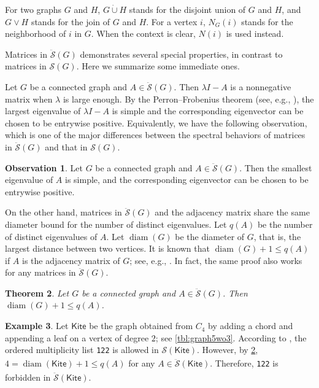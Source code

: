 \documentclass{article}
\newtheorem{theorem}{Theorem}[section]
\theoremstyle{definition}
\newtheorem{observation}[theorem]{Observation}
\newtheorem{example}[theorem]{Example}
\newcommand{\dunion}{\mathbin{\dot\cup}}
\newcommand{\mptn}{\mathcal{S}}
\newcommand{\mdso}{\ddot{\mathcal{S}}}
\newcommand{\Kite}{\mathsf{Kite}}
\newcommand{\mtt}[2][]{\texttt{#2}\textsubscript{#1}}
\newcommand{\diam}{\operatorname{diam}}
\begin{document}
For two graphs $G$ and $H$, $G\dunion H$ stands for the disjoint union of $G$ and $H$, and $G\vee H$ stands for the join of $G$ and $H$.  For a vertex $i$, $N_G(i)$ stands for the neighborhood of $i$ in $G$.   When the context is clear, $N(i)$ is used instead.

Matrices in $\mdso(G)$ demonstrates several special properties, in contrast to matrices in $\mptn(G)$.  Here we summarize some immediate ones.

Let $G$ be a connected graph and $A\in\mdso(G)$.  Then $\lambda I - A$ is a nonnegative matrix when $\lambda$ is large enough.  By the Perron--Frobenius theorem (see, e.g., \cite[Theorem~2.2.1]{BHSoG12}), the largest eigenvalue of $\lambda I - A$ is simple and the corresponding eigenvector can be chosen to be entrywise positive.  Equivalently, we have the following observation, which is one of the major differences between the spectral behaviors of matrices in $\mdso(G)$ and that in $\mptn(G)$.  

\begin{observation}
\label{obs:pf}
Let $G$ be a connected graph and $A\in\mdso(G)$. Then the smallest eigenvalue of $A$ is simple, and the corresponding eigenvector can be chosen to be entrywise positive.  
\end{observation}

On the other hand, matrices in $\mdso(G)$ and the adjacency matrix share the same diameter bound for the number of distinct eigenvalues.  Let $q(A)$ be the number of distinct eigenvalues of $A$.  Let $\diam(G)$ be the diameter of $G$, that is, the largest distance between two vertices.  It is known that $\diam(G) + 1 \leq q(A)$ if $A$ is the adjacency matrix of $G$; see, e.g., \cite{BHSoG12}.  In fact, the same proof also works for any matrices in $\mdso(G)$.  

\begin{theorem}
\label{thm:diam}
Let $G$ be a connected graph and $A\in\mdso(G)$.  Then $\diam(G) + 1 \leq q(A)$.   
\end{theorem}

\begin{example}
\label{ex:kited}
Let $\Kite$ be the graph obtained from $C_4$ by adding a chord and appending a leaf on a vertex of degree $2$; see \cref{tbl:graph5wo3}.  According to \cite{IEPG2}, the ordered multiplicity list \mtt{122} is allowed in $\mptn(\Kite)$.  However, by \cref{thm:diam}, $4 = \diam(\Kite) + 1 \leq q(A)$ for any $A\in\mdso(\Kite)$.  Therefore, \mtt{122} is forbidden in $\mdso(\Kite)$.  
\end{example}
\end{document}
